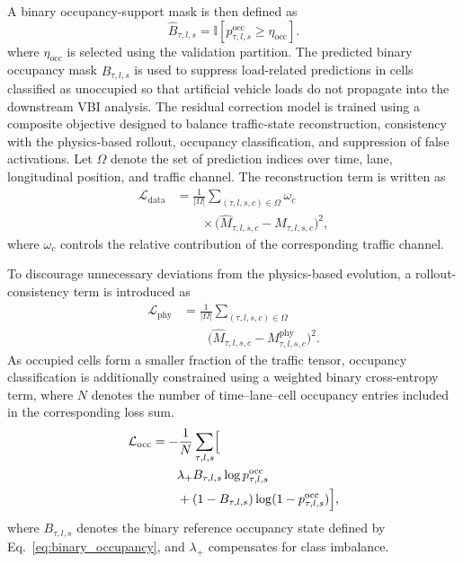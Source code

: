 \documentclass[journal]{IEEEtran}
\begin{document}
A binary occupancy-support mask is then defined as
\begin{equation}
\widehat{B}_{\tau,l,s}=\mathbb{I}\left[p^{\mathrm{occ}}_{\tau,l,s}\geq\eta_{\mathrm{occ}}\right].
\label{eq:predicted_binary_occupancy}
\end{equation}
where $\eta_{\mathrm{occ}}$ is selected using the validation partition. The predicted binary occupancy mask \(\hat B_{\tau,l,s}\) is used to suppress load-related predictions in cells classified as unoccupied so that artificial vehicle loads do not propagate into the downstream VBI analysis.
The residual correction model is trained using a composite objective designed to balance traffic-state reconstruction, consistency with the physics-based rollout, occupancy classification, and suppression of false activations. Let $\Omega$ denote the set of prediction indices over time, lane, longitudinal position, and traffic channel. The reconstruction term is written as
\begin{equation}
\begin{aligned}
\mathcal{L}_{\mathrm{data}}&=\frac{1}{|\Omega|}\sum_{(\tau,l,s,c)\in\Omega}\omega_c\\
&\qquad\times\bigl(\widehat{M}_{\tau,l,s,c}-M_{\tau,l,s,c}\bigr)^2,
\end{aligned}
\end{equation}
where $\omega_c$ controls the relative contribution of the corresponding traffic channel.

To discourage unnecessary deviations from the physics-based evolution, a rollout-consistency term is introduced as
\begin{equation}
\begin{aligned}
\mathcal{L}_{\mathrm{phy}}&=\frac{1}{|\Omega|}\sum_{(\tau,l,s,c)\in\Omega}\\
&\qquad\bigl(\widehat{M}_{\tau,l,s,c}-M_{\tau,l,s,c}^{\mathrm{phy}}\bigr)^2.
\end{aligned}
\end{equation}
As occupied cells form a smaller fraction of the traffic tensor, occupancy classification is additionally constrained using a weighted binary cross-entropy term, where $N$ denotes the number of time--lane--cell occupancy entries included in the corresponding loss sum.
\begin{equation}
\begin{aligned}
\mathcal{L}_{\mathrm{occ}}&=-\frac{1}{N}\sum_{\tau,l,s}\Bigl[\\
&\qquad\lambda_{+}B_{\tau,l,s}\log p_{\tau,l,s}^{\mathrm{occ}}\\
&\qquad+(1-B_{\tau,l,s})\log(1-p_{\tau,l,s}^{\mathrm{occ}})\Bigr],
\end{aligned}
\end{equation}
where $B_{\tau,l,s}$ denotes the binary reference occupancy state defined by Eq.~\eqref{eq:binary_occupancy}, and $\lambda_{+}$ compensates for class imbalance.
\end{document}
